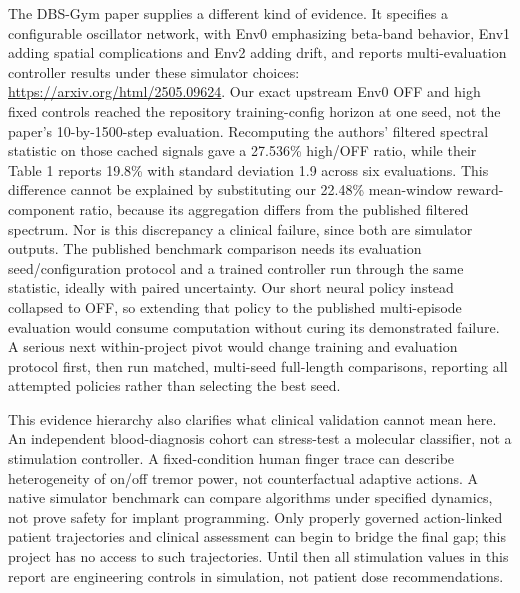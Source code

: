 The DBS-Gym paper supplies a different kind of evidence. It specifies a configurable oscillator network, with Env0 emphasizing beta-band behavior, Env1 adding spatial complications and Env2 adding drift, and reports multi-evaluation controller results under these simulator choices: \url{https://arxiv.org/html/2505.09624}. Our exact upstream Env0 OFF and high fixed controls reached the repository training-config horizon at one seed, not the paper's 10-by-1500-step evaluation. Recomputing the authors' filtered spectral statistic on those cached signals gave a 27.536\% high/OFF ratio, while their Table 1 reports 19.8\% with standard deviation 1.9 across six evaluations. This difference cannot be explained by substituting our 22.48\% mean-window reward-component ratio, because its aggregation differs from the published filtered spectrum. Nor is this discrepancy a clinical failure, since both are simulator outputs. The published benchmark comparison needs its evaluation seed/configuration protocol and a trained controller run through the same statistic, ideally with paired uncertainty. Our short neural policy instead collapsed to OFF, so extending that policy to the published multi-episode evaluation would consume computation without curing its demonstrated failure. A serious next within-project pivot would change training and evaluation protocol first, then run matched, multi-seed full-length comparisons, reporting all attempted policies rather than selecting the best seed.

This evidence hierarchy also clarifies what clinical validation cannot mean here. An independent blood-diagnosis cohort can stress-test a molecular classifier, not a stimulation controller. A fixed-condition human finger trace can describe heterogeneity of on/off tremor power, not counterfactual adaptive actions. A native simulator benchmark can compare algorithms under specified dynamics, not prove safety for implant programming. Only properly governed action-linked patient trajectories and clinical assessment can begin to bridge the final gap; this project has no access to such trajectories. Until then all stimulation values in this report are engineering controls in simulation, not patient dose recommendations.

